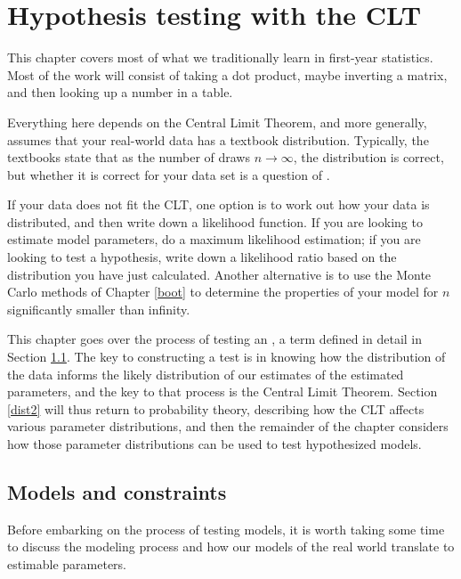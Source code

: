 \chapter[Gaussian tricks]{Hypothesis testing with the CLT} \label{testing} \label{gauss}

This chapter covers most of what we traditionally learn in first-year statistics. 
 Most of the work will consist of taking a dot product, maybe inverting a matrix,
and then looking up a number in a table. 

Everything here depends on the Central Limit Theorem, and more
generally, assumes that your real-world data has a textbook
distribution. Typically, the textbooks state that as the number of draws
$n \to \infty$, the distribution is correct, but whether it is correct
for your data set is a question of .

If your data does not fit the CLT, one option is to work out how your data
is distributed, and then write down a likelihood function. If you are
looking to estimate model parameters, do a maximum likelihood estimation;
if you are looking to test a hypothesis, write down a likelihood ratio
based on the distribution you have just calculated.  Another alternative
is to use the Monte Carlo methods of Chapter \ref{boot} to determine
the properties of your model for $n$ significantly smaller than infinity.

This chapter goes over the process of testing an ,
a term defined in detail in Section \ref{mcsec}. The key to constructing
a test is in knowing how the distribution of the data informs the likely
distribution of our estimates of the estimated parameters, and the key to that
process is the Central Limit Theorem. Section \ref{dist2} will
thus return to probability theory, describing how the CLT affects various
parameter distributions, and then the remainder of the chapter considers
how those parameter distributions can be used to test hypothesized models.

\section{Models and constraints}\label{mcsec}
Before embarking on the process of testing models, it is worth taking
some time to discuss the modeling process and how our models of the
real world translate to estimable parameters.

